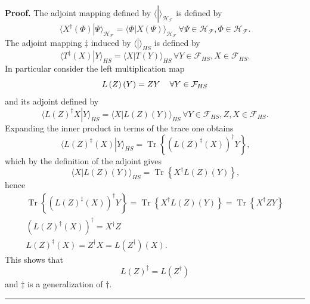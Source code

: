 \documentclass[aps, preprint]{revtex4}
\newenvironment{proof}[1][Proof]{\noindent\textbf{#1.} }{\ \rule{0.5em}{0.5em}}
\begin{document}
\begin{proof}
The adjoint mapping defined by $ \langle \left .\text{}\right \vert  \rangle _{\mathcal{H}_{\mathcal{F}}}$ is defined by
\begin{equation} \langle \left .X^{ \dag } \left (\Phi \right )\right \vert \Psi  \rangle _{\mathcal{H}_{\mathcal{F}}} = \langle \left .\Phi \right \vert X \left (\Psi \right ) \rangle _{\mathcal{H}_{\mathcal{F}}}\, \forall \Psi  \in \mathcal{H}_{\mathcal{F}} ,\Phi  \in \mathcal{H}_{\mathcal{F}}\text{.}
\end{equation}The adjoint mapping $ \ddag $ induced by $ \langle \left .\text{}\right \vert  \rangle _{H S}$ is defined by
\begin{equation} \langle \left .T^{ \ddag } \left (X\right )\right \vert Y \rangle _{H S} = \langle \left .X\right \vert T \left (Y\right ) \rangle _{H S}\, \forall Y \in \mathcal{F}_{H S} ,X \in \mathcal{F}_{H S}\text{.}
\end{equation}In particular consider the left multiplication map
\begin{equation}L \left (Z\right ) \left (Y\right ) =Z Y\text{\thinspace \quad } \forall Y \in \mathcal{F}_{H S}
\end{equation}and its adjoint defined by
\begin{equation} \langle \left .L \left (Z\right )^{ \ddag } X\right \vert Y \rangle _{H S} = \langle \left .X\right \vert L \left (Z\right ) \left (Y\right ) \rangle _{H S}\, \forall Y \in \mathcal{F}_{H S} ,Z ,X \in \mathcal{F}_{H S}\text{.}
\end{equation}Expanding the inner product in terms of the trace one obtains
\begin{equation} \langle \left .L \left (Z\right )^{ \ddag } \left (X\right )\right \vert Y \rangle _{H S} =\ensuremath{\operatorname*{Tr}} \left \{\left (L \left (Z\right )^{ \ddag } \left (X\right )\right )^{ \dag } Y\right \}\text{,}
\end{equation}which by the definition of the adjoint gives
\begin{equation} \langle \left .X\right \vert L \left (Z\right ) \left (Y\right ) \rangle _{H S} =\ensuremath{\operatorname*{Tr}} \left \{X^{ \dag } L \left (Z\right ) \left (Y\right )\right \}\text{,}
\end{equation}hence
\begin{gather}\ensuremath{\operatorname*{Tr}} \left \{\left (L \left (Z\right )^{ \ddag } \left (X\right )\right )^{ \dag } Y\right \} =\ensuremath{\operatorname*{Tr}} \left \{X^{ \dag } L \left (Z\right ) \left (Y\right )\right \} =\ensuremath{\operatorname*{Tr}} \left \{X^{ \dag } Z Y\right \} \\
\left (L \left (Z\right )^{ \ddag } \left (X\right )\right )^{ \dag } =X^{ \dag } Z \\
L \left (Z\right )^{ \ddag } \left (X\right ) =Z^{ \dag } X =L \left (Z^{ \dag }\right ) \left (X\right )\text{.}\end{gather}This shows that
\begin{equation}L \left (Z\right )^{ \ddag } =L \left (Z^{ \dag }\right )
\end{equation}and $ \ddag $ is a generalization of $ \dag \text{.}$ 
\end{proof}
\end{document}
